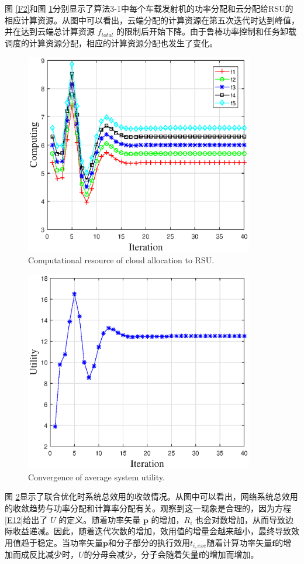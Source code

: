 图 \ref{F2}和图 \ref{F3}分别显示了算法3-1中每个车载发射机的功率分配和云分配给RSU的相应计算资源。从图中可以看出，云端分配的计算资源在第五次迭代时达到峰值，
并在达到云端总计算资源 $f_{total}$ 的限制后开始下降。由于鲁棒功率控制和任务卸载调度的计算资源分配，相应的计算资源分配也发生了变化。
\begin{figure}[H]
\centering
\includegraphics[width=10cm]{figures//chap3//ff.eps}
\caption{Computational resource of cloud allocation to RSU.}
\label{F3}
\end{figure}

\begin{figure}[H]
\centering
\includegraphics[width=10cm]{figures//chap3//ee.eps}
\caption{Convergence of average system utility.}
\label{F4}
\end{figure}


图 \ref{F4}显示了联合优化时系统总效用的收敛情况。从图中可以看出，网络系统总效用的收敛趋势与功率分配和计算率分配有关。观察到这一现象是合理的，因为方程 \eqref{E12}给出了 $U$ 的定义。随着功率矢量 $\mathbf{p}$ 的增加，$R_i$ 也会对数增加，从而导致边际收益递减。因此，随着迭代次数的增加，效用值的增量会越来越小，最终导致效用值趋于稳定。当功率矢量$\mathbf{p}$和分子部分的执行效用$t_{i,exe}$随着计算功率矢量$\mathbf{f}$的增加而成反比减少时，$U$的分母会减少，分子会随着矢量$\mathbf{f}$的增加而增加。

